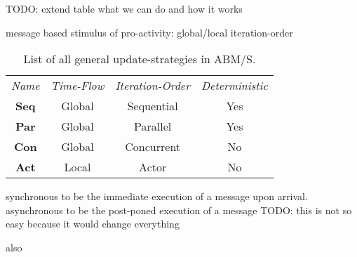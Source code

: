 TODO: extend table what we can do and how it works

message based
stimulus of pro-activity: global/local
iteration-order

\begin{table}[H]
	\center
	\begin{tabular}{ c | c | c | c  }
		\textit{Name} & \textit{Time-Flow} & \textit{Iteration-Order} & \textit{Deterministic} \\
		\hhline{=|=|=|=}
	    \textbf{Seq} & Global & Sequential & Yes \\
	    \hline
	    \textbf{Par} & Global & Parallel & Yes \\
	    \hline
	    \textbf{Con} & Global & Concurrent & No \\
	    \hline
	    \textbf{Act} & Local & Actor & No \\
	\end{tabular}
	\caption{List of all general update-strategies in ABM/S.}
\end{table}

synchronous to be the immediate execution of a message upon arrival.
asynchronous to be the post-poned execution of a message 
TODO: this is not so easy because it would change everything

also 